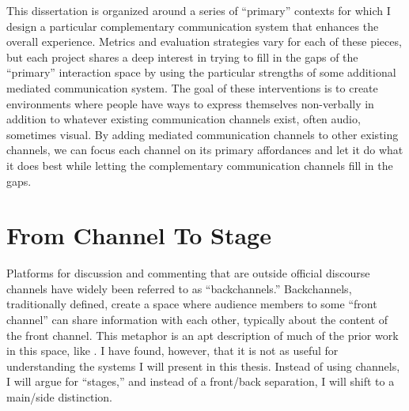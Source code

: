 This dissertation is organized around a series of ``primary'' contexts for which I design a particular complementary communication system that enhances the overall experience. Metrics and evaluation strategies vary for each of these pieces, but each project shares a deep interest in trying to fill in the gaps of the ``primary'' interaction space by using the particular strengths of some additional mediated communication system. The goal of these interventions is to create environments where people have ways to express themselves non-verbally in addition to whatever existing communication channels exist, often audio, sometimes visual. By adding mediated communication channels to other existing channels, we can focus each channel on its primary affordances and let it do what it does best while letting the complementary communication channels fill in the gaps.


\section{From Channel To Stage}

Platforms for discussion and commenting that are outside official discourse channels have widely been referred to as ``backchannels.''  Backchannels, traditionally defined, create a space where audience members to some ``front channel'' can share information with each other, typically about the content of the front channel.  This metaphor is an apt description of much of the prior work in this space, like \citep{Cogdill:2001fp,Yardi:2006uk,mccarthy_digital_2004,Rekimoto:1998jy}. I have found, however, that it is not as useful for understanding the systems I will present in this thesis. Instead of using channels, I will argue for ``stages,'' and instead of a front/back separation, I will shift to a main/side distinction. 


